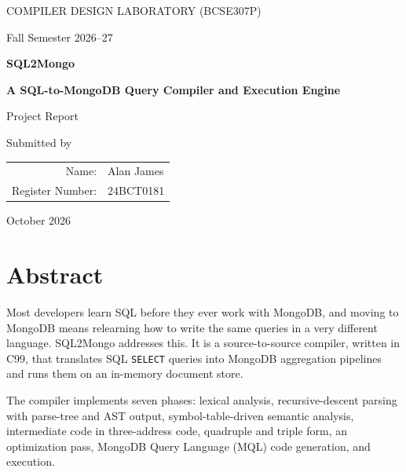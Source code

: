 \documentclass[12pt,a4paper]{report}
\newcommand{\codeus}{\textunderscore\allowbreak}
\DeclareRobustCommand{\code}[1]{\texttt{\let\_\codeus #1}}
\begin{document}
\begin{titlepage}
\centering
{}
\vspace*{1cm}
{\large COMPILER DESIGN LABORATORY (BCSE307P)\par}
\vspace{0.2cm}
{\large Fall Semester 2026--27\par}
\vspace{3.5cm}
{\LARGE\bfseries SQL2Mongo\par}
\vspace{0.4cm}
{\Large\bfseries A SQL-to-MongoDB Query Compiler and Execution Engine\par}
\vspace{1.5cm}
{\Large Project Report\par}
\vspace{3.5cm}
{\large Submitted by\par}
\vspace{0.5cm}
{\large
\begin{tabular}{rl}
Name: & Alan James \\
Register Number: & 24BCT0181 \\
\end{tabular}\par}
\vfill
{\large October 2026\par}
\end{titlepage}

\chapter*{Abstract}

Most developers learn SQL before they ever work with MongoDB, and moving to MongoDB means relearning how to write the same queries in a very different language. SQL2Mongo addresses this. It is a source-to-source compiler, written in C99, that translates SQL \code{SELECT} queries into MongoDB aggregation pipelines and runs them on an in-memory document store.

The compiler implements seven phases: lexical analysis, recursive-descent parsing with parse-tree and AST output, symbol-table-driven semantic analysis, intermediate code in three-address code, quadruple and triple form, an optimization pass, MongoDB Query Language (MQL) code generation, and execution.
\end{document}
